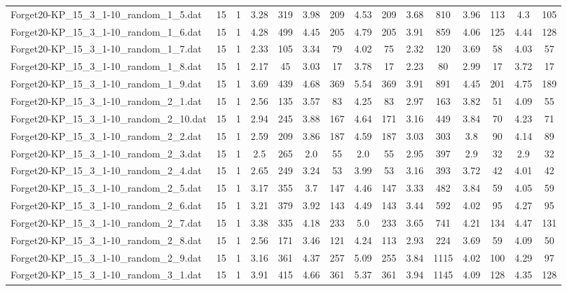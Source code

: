 \begin{table}[!ht]
{\begin{tabular}{lcccccccccccccc}
Forget20-KP\_15\_3\_1-10\_random\_1\_5.dat & 15 & 1 & 3.28 & 319 & 3.98 & 209 & 4.53 & 209 & 3.68 & 810 & 3.96 & 113 & 4.3 & 105 \\
Forget20-KP\_15\_3\_1-10\_random\_1\_6.dat & 15 & 1 & 4.28 & 499 & 4.45 & 205 & 4.79 & 205 & 3.91 & 859 & 4.06 & 125 & 4.44 & 128 \\
Forget20-KP\_15\_3\_1-10\_random\_1\_7.dat & 15 & 1 & 2.33 & 105 & 3.34 & 79 & 4.02 & 75 & 2.32 & 120 & 3.69 & 58 & 4.03 & 57 \\
Forget20-KP\_15\_3\_1-10\_random\_1\_8.dat & 15 & 1 & 2.17 & 45 & 3.03 & 17 & 3.78 & 17 & 2.23 & 80 & 2.99 & 17 & 3.72 & 17 \\
Forget20-KP\_15\_3\_1-10\_random\_1\_9.dat & 15 & 1 & 3.69 & 439 & 4.68 & 369 & 5.54 & 369 & 3.91 & 891 & 4.45 & 201 & 4.75 & 189 \\
Forget20-KP\_15\_3\_1-10\_random\_2\_1.dat & 15 & 1 & 2.56 & 135 & 3.57 & 83 & 4.25 & 83 & 2.97 & 163 & 3.82 & 51 & 4.09 & 55 \\
Forget20-KP\_15\_3\_1-10\_random\_2\_10.dat & 15 & 1 & 2.94 & 245 & 3.88 & 167 & 4.64 & 171 & 3.16 & 449 & 3.84 & 70 & 4.23 & 71 \\
Forget20-KP\_15\_3\_1-10\_random\_2\_2.dat & 15 & 1 & 2.59 & 209 & 3.86 & 187 & 4.59 & 187 & 3.03 & 303 & 3.8 & 90 & 4.14 & 89 \\
Forget20-KP\_15\_3\_1-10\_random\_2\_3.dat & 15 & 1 & 2.5 & 265 & 2.0 & 55 & 2.0 & 55 & 2.95 & 397 & 2.9 & 32 & 2.9 & 32 \\
Forget20-KP\_15\_3\_1-10\_random\_2\_4.dat & 15 & 1 & 2.65 & 249 & 3.24 & 53 & 3.99 & 53 & 3.16 & 393 & 3.72 & 42 & 4.01 & 42 \\
Forget20-KP\_15\_3\_1-10\_random\_2\_5.dat & 15 & 1 & 3.17 & 355 & 3.7 & 147 & 4.46 & 147 & 3.33 & 482 & 3.84 & 59 & 4.05 & 59 \\
Forget20-KP\_15\_3\_1-10\_random\_2\_6.dat & 15 & 1 & 3.21 & 379 & 3.92 & 143 & 4.49 & 143 & 3.44 & 592 & 4.02 & 95 & 4.27 & 95 \\
Forget20-KP\_15\_3\_1-10\_random\_2\_7.dat & 15 & 1 & 3.38 & 335 & 4.18 & 233 & 5.0 & 233 & 3.65 & 741 & 4.21 & 134 & 4.47 & 131 \\
Forget20-KP\_15\_3\_1-10\_random\_2\_8.dat & 15 & 1 & 2.56 & 171 & 3.46 & 121 & 4.24 & 113 & 2.93 & 224 & 3.69 & 59 & 4.09 & 50 \\
Forget20-KP\_15\_3\_1-10\_random\_2\_9.dat & 15 & 1 & 3.16 & 361 & 4.37 & 257 & 5.09 & 255 & 3.84 & 1115 & 4.02 & 100 & 4.29 & 97 \\
Forget20-KP\_15\_3\_1-10\_random\_3\_1.dat & 15 & 1 & 3.91 & 415 & 4.66 & 361 & 5.37 & 361 & 3.94 & 1145 & 4.09 & 128 & 4.35 & 128 \\

\end{tabular}}
\end{table}
